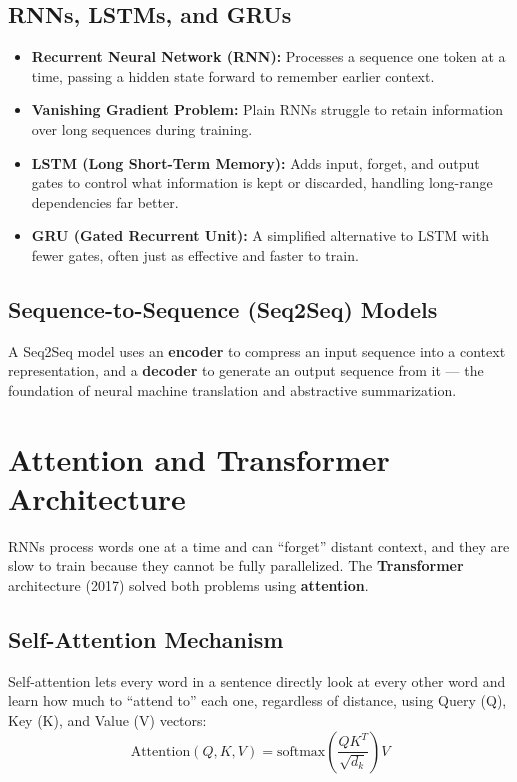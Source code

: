 \documentclass[11pt,a4paper]{article}
\begin{document}
\subsection{RNNs, LSTMs, and GRUs}
\begin{itemize}[leftmargin=*]
  \item \textbf{Recurrent Neural Network (RNN):} Processes a sequence one token at a time, passing a hidden state forward to remember earlier context.
  \item \textbf{Vanishing Gradient Problem:} Plain RNNs struggle to retain information over long sequences during training.
  \item \textbf{LSTM (Long Short-Term Memory):} Adds input, forget, and output gates to control what information is kept or discarded, handling long-range dependencies far better.
  \item \textbf{GRU (Gated Recurrent Unit):} A simplified alternative to LSTM with fewer gates, often just as effective and faster to train.
\end{itemize}

\subsection{Sequence-to-Sequence (Seq2Seq) Models}
\begin{conceptbox}
A Seq2Seq model uses an \textbf{encoder} to compress an input sequence into a context representation, and a \textbf{decoder} to generate an output sequence from it --- the foundation of neural machine translation and abstractive summarization.
\end{conceptbox}

\section{Attention and Transformer Architecture}

\begin{definitionbox}
RNNs process words one at a time and can ``forget'' distant context, and they are slow to train because they cannot be fully parallelized. The \textbf{Transformer} architecture (2017) solved both problems using \textbf{attention}.
\end{definitionbox}

\subsection{Self-Attention Mechanism}
\begin{conceptbox}
Self-attention lets every word in a sentence directly look at every other word and learn how much to ``attend to'' each one, regardless of distance, using Query (Q), Key (K), and Value (V) vectors:
$$
\text{Attention}(Q,K,V) = \text{softmax}\!\left(\frac{QK^{T}}{\sqrt{d_k}}\right)V
$$
\end{conceptbox}
\end{document}
